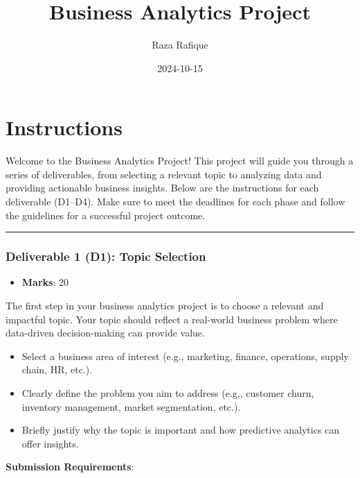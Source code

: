 \documentclass[
]{article}
\title{Business Analytics Project}
\author{Raza Rafique}
\date{2024-10-15}
\providecommand{\tightlist}{%
  \setlength{\itemsep}{0pt}\setlength{\parskip}{0pt}}
\begin{document}
\maketitle

\section{\texorpdfstring{\textbf{Instructions}}{Instructions}}\label{instructions}

Welcome to the Business Analytics Project! This project will guide you
through a series of deliverables, from selecting a relevant topic to
analyzing data and providing actionable business insights. Below are the
instructions for each deliverable (D1--D4). Make sure to meet the
deadlines for each phase and follow the guidelines for a successful
project outcome.

\begin{center}\rule{0.5\linewidth}{0.5pt}\end{center}

\subsubsection{\texorpdfstring{\textbf{Deliverable 1 (D1): Topic
Selection}}{Deliverable 1 (D1): Topic Selection}}\label{deliverable-1-d1-topic-selection}

\begin{itemize}
\tightlist
\item
  \textbf{Marks}: 20
\end{itemize}

The first step in your business analytics project is to choose a
relevant and impactful topic. Your topic should reflect a real-world
business problem where data-driven decision-making can provide value.

\begin{itemize}
\tightlist
\item
  Select a business area of interest (e.g., marketing, finance,
  operations, supply chain, HR, etc.).
\item
  Clearly define the problem you aim to address (e.g., customer churn,
  inventory management, market segmentation, etc.).
\item
  Briefly justify why the topic is important and how predictive
  analytics can offer insights.
\end{itemize}

\textbf{Submission Requirements}:
\end{document}
